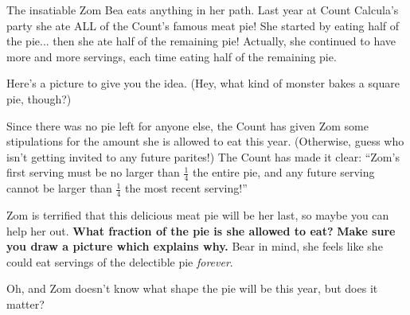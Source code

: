 


The insatiable Zom Bea eats anything in her path. Last year at Count Calcula's party she ate ALL of the Count's famous meat pie! She started by eating half of the pie... then she ate half of the remaining pie! Actually, she
continued to have more and more servings, each time eating half of the
remaining pie.

Here's a picture to give you the idea. (Hey, what kind of monster bakes
a square pie, though?)

\begin{center}
\end{center}

Since there was no pie left for anyone else, the Count has given Zom some
stipulations for the amount she is allowed to eat this year.
(Otherwise, guess who isn't getting invited to any future parites!) The Count
has made it clear: ``Zom's first serving must be
no larger than \(\frac{1}{4}\) the entire pie, and any future serving cannot
be larger than \(\frac{1}{4}\) the most recent serving!''

Zom is terrified that this delicious meat pie will be her last, so maybe you can
help her out. \textbf{What fraction of the pie is she allowed to eat?}
\textbf{Make sure you draw a picture which explains why.}
Bear in mind, she feels like she could eat servings of the delectible
pie \textit{forever}.

Oh, and Zom doesn't know what shape the pie will be this year, but does
it matter?
